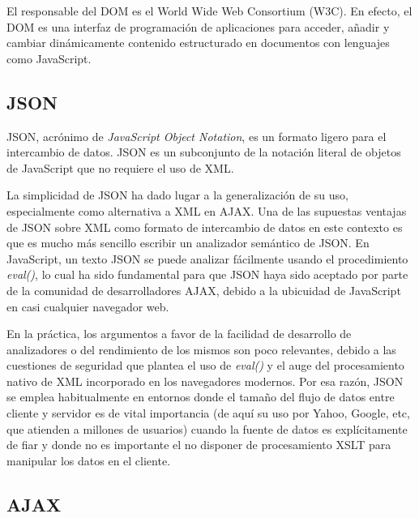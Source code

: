     El responsable del DOM es el World Wide Web Consortium (W3C).
    En efecto, el DOM es una interfaz de programación de aplicaciones para acceder, añadir y cambiar dinámicamente contenido estructurado en documentos con lenguajes como JavaScript.
    
  
  \subsection{JSON} %
    \label{sub:tec_json}
    
    JSON, acrónimo de {\it JavaScript Object Notation}, es un formato ligero para el intercambio de datos. JSON es un subconjunto de la notación literal de objetos de JavaScript que no requiere el uso de XML.
    
    La simplicidad de JSON ha dado lugar a la generalización de su uso, especialmente como alternativa a XML en AJAX. Una de las supuestas ventajas de JSON sobre XML como formato de intercambio de datos en este contexto es que es mucho más sencillo escribir un analizador semántico de JSON. En JavaScript, un texto JSON se puede analizar fácilmente usando el procedimiento {\it eval()}, lo cual ha sido fundamental para que JSON haya sido aceptado por parte de la comunidad de desarrolladores AJAX, debido a la ubicuidad de JavaScript en casi cualquier navegador web.
    
    En la práctica, los argumentos a favor de la facilidad de desarrollo de analizadores o del rendimiento de los mismos son poco relevantes, debido a las cuestiones de seguridad que plantea el uso de {\it eval()} y el auge del procesamiento nativo de XML incorporado en los navegadores modernos. Por esa razón, JSON se emplea habitualmente en entornos donde el tamaño del flujo de datos entre cliente y servidor es de vital importancia (de aquí su uso por Yahoo, Google, etc, que atienden a millones de usuarios) cuando la fuente de datos es explícitamente de fiar y donde no es importante el no disponer de procesamiento XSLT para manipular los datos en el cliente.
    
  
  \subsection{AJAX} %
    \label{sub:tec_ajax}
  
